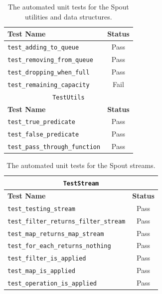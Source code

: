 \documentclass[11pt,a4paper]{report}
\begin{document}
\begin{subappendices}
\begin{table}[htpb]
\begin{tabular}{|l|c|}
        \hline
        \textbf{Test Name} & \textbf{Status} \\
        \hline
        \verb+test_adding_to_queue+ & \cellcolor{green!25}Pass \\
        \verb+test_removing_from_queue+ & \cellcolor{green!25}Pass \\
        \verb+test_dropping_when_full+ & \cellcolor{green!25}Pass \\
        \verb+test_remaining_capacity+ & \cellcolor{red!25}Fail \\
        \hline
        \multicolumn{2}{|c|}{\texttt{TestUtils}} \\
        \hline
        \textbf{Test Name} & \textbf{Status} \\
        \hline
        \verb+test_true_predicate+ & \cellcolor{green!25}Pass \\
        \verb+test_false_predicate+ & \cellcolor{green!25}Pass \\
        \verb+test_pass_through_function+ & \cellcolor{green!25}Pass \\
        \hline
    \end{tabular}
    \caption*{The automated unit tests for the Spout utilities and data structures.}
\end{table}
\begin{table}[htpb]
    \centering
    \begin{tabular}{|l|c|}
        \hline
        \multicolumn{2}{|c|}{\texttt{TestStream}} \\
        \hline
        \textbf{Test Name} & \textbf{Status} \\
        \hline
        \verb+test_testing_stream+ & \cellcolor{green!25}Pass \\
        \verb+test_filter_returns_filter_stream+ & \cellcolor{green!25}Pass \\
        \verb+test_map_returns_map_stream+ & \cellcolor{green!25}Pass \\
        \verb+test_for_each_returns_nothing+ & \cellcolor{green!25}Pass \\
        \verb+test_filter_is_applied+ & \cellcolor{green!25}Pass \\
        \verb+test_map_is_applied+ & \cellcolor{green!25}Pass \\
        \verb+test_operation_is_applied+ & \cellcolor{green!25}Pass \\
        \hline
    \end{tabular}
    \caption*{The automated unit tests for the Spout streams.}
\end{table}
\pagebreak


\end{subappendices}
\end{document}
